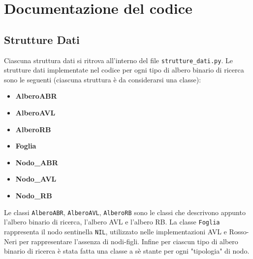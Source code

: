 \section{Documentazione del codice}
\subsection{Strutture Dati}
Ciascuna struttura dati si ritrova all'interno del file \texttt{strutture\_dati.py}.
Le strutture dati implementate nel codice per ogni tipo di albero binario di ricerca sono le seguenti (ciascuna struttura è da considerarsi una classe):
\begin{itemize}
	\item \textbf{AlberoABR}
	\item \textbf{AlberoAVL}
	\item \textbf{AlberoRB}
	\item \textbf{Foglia}
	\item \textbf{Nodo\_ABR}
	\item \textbf{Nodo\_AVL}
	\item \textbf{Nodo\_RB}
\end{itemize}
Le classi \texttt{AlberoABR}, \texttt{AlberoAVL}, \texttt{AlberoRB} sono le classi che descrivono appunto l'albero binario di ricerca, l'albero AVL e l'albero RB.
La classe \texttt{Foglia} rappresenta il nodo sentinella \texttt{NIL},
utilizzato nelle implementazioni AVL e Rosso-Neri per rappresentare
l'assenza di nodi-figli.
Infine per ciascun tipo di albero binario di ricerca è stata fatta una classe a sè stante per ogni "tipologia" di nodo.
